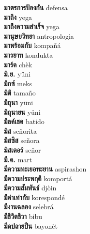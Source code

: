 \textbf{ มาตรการป้องกัน  } defensa \\
\textbf{ มาถึง  } yega \\
\textbf{ มาถึงความสำเร็จ  } yega \\
\textbf{ มานุษยวิทยา  } antropologia \\
\textbf{ มาพร้อมกับ  } kompañá \\
\textbf{ มารยาท  } kondukta \\
\textbf{ มาร์ค  } chèk \\
\textbf{ มิ.ย.  } yüni \\
\textbf{ มิกซ์  } meks \\
\textbf{ มิติ  } tamaño \\
\textbf{ มิถุนา  } yüni \\
\textbf{ มิถุนายน  } yüni \\
\textbf{ มิลค์เชค  } batido \\
\textbf{ มิส  } señorita \\
\textbf{ มิสซิส  } señora \\
\textbf{ มิสเตอร์  } señor \\
\textbf{ มี.ค.  } mart \\
\textbf{ มีความทะเยอทะยาน  } aspirashon \\
\textbf{ มีความประพฤติ  } komportá \\
\textbf{ มีความสัมพันธ์  } djòin \\
\textbf{ มีค่าเท่ากับ  } korespondé \\
\textbf{ มีงานฉลอง  } selebrá \\
\textbf{ มีชีวิตชีวา  } bibu \\
\textbf{ มีดปลายปืน  } bayonèt \\
